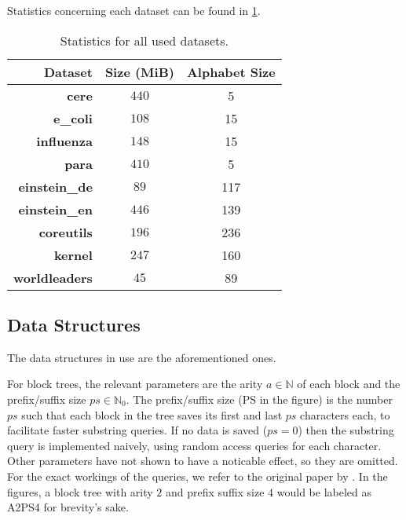 \documentclass{scrartcl}
\begin{document}
Statistics concerning each dataset can be found in \cref{tab:03:datastats}.

\begin{table}
	\caption{Statistics for all used datasets.}
	\label{tab:03:datastats}
	\centering
	\begin{tabular}[c]{r|c|c}
		\textbf{Dataset}      & \textbf{Size (MiB)} & \textbf{Alphabet Size} \\\hline\hline
		\textbf{cere}         & $440$               & 5                      \\
		\textbf{e\_coli}      & $108$               & 15                     \\
		\textbf{influenza}    & $148$               & 15                     \\
		\textbf{para}         & $410$               & 5                      \\
		\textbf{einstein\_de} & $89$                & 117                    \\
		\textbf{einstein\_en} & $446$               & 139                    \\
		\textbf{coreutils}    & $196$               & 236                    \\
		\textbf{kernel}       & $247$               & 160                    \\
		\textbf{worldleaders} & $45$                & 89                     \\
	\end{tabular}
\end{table}

\subsection{Data Structures}

The data structures in use are the aforementioned ones.

For block trees, the relevant parameters are the arity $a \in \mathbb{N}$ of each block and the prefix/suffix size $ps \in \mathbb{N}_0$.
The prefix/suffix size (PS in the figure) is the number $ps$ such that each block in the tree saves its first and last $ps$ characters each, to facilitate faster substring queries.
If no data is saved ($ps = 0$) then the substring query is implemented naively, using random access queries for each character.
Other parameters have not shown to have a noticable effect, so they are omitted.
For the exact workings of the queries, we refer to the original paper by \citeauthor{belazzougui_block_2021} \cite{belazzougui_block_2021}.
In the figures, a block tree with arity $2$ and prefix suffix size $4$ would be labeled as A2PS4 for brevity's sake.
\end{document}
